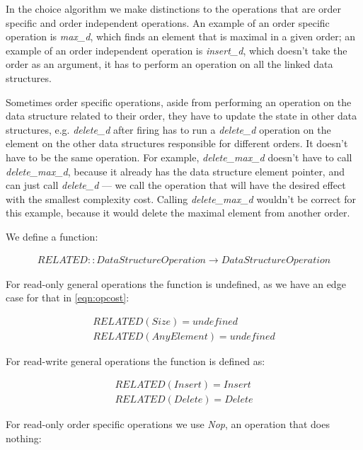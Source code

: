 \documentclass[a4paper,11pt]{article}
\begin{document}
			In the choice algorithm we make distinctions to the operations that are order specific and order independent
            operations. An example of an order specific operation is \emph{max\_d}, which finds an element that is maximal in
            a given order; an example of an order independent operation is \emph{insert\_d}, which doesn't take the order as an
            argument, it has to perform an operation on all the linked data structures. 

            Sometimes order specific operations, aside from performing an operation on the data structure related to their order, they have to update the state in other data structures, e.g. \emph{delete\_d} after firing has to run a \emph{delete\_d} operation on the element on the other data structures responsible for different orders. It doesn't have to be the same operation. For example, \emph{delete\_max\_d} doesn't have to call \emph{delete\_max\_d}, because it already has the data structure element pointer, and can just call \emph{delete\_d} --- we call the operation
            that will have the desired effect with the smallest complexity cost. Calling \emph{delete\_max\_d} wouldn't be correct for this example, because it would delete the maximal element from another order.

			We define a function:

			\begin{eqnarray}
                \mathit{RELATED} :: \mathit{DataStructureOperation} \rightarrow \mathit{DataStructureOperation}
            \end{eqnarray}

            For read-only general operations the function is undefined, as we have an edge case for that in \autoref{eqn:opcost}:

			\begin{eqnarray}
                \mathit{RELATED}(Size) = undefined\\
                \mathit{RELATED}(AnyElement) = undefined
            \end{eqnarray}

            For read-write general operations the function is defined as:

			\begin{eqnarray}
                \mathit{RELATED}(Insert) = Insert\\
                \mathit{RELATED}(Delete) = Delete
            \end{eqnarray}

            For read-only order specific operations we use \emph{Nop}, an operation that does nothing:
\end{document}
